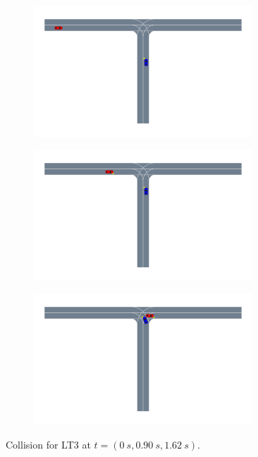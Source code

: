 \begin{figure}
\vskip -0.2in
    \centering
    \begin{subfigure}[t]{0.33\columnwidth}
        \centering
        \includegraphics[width=0.9\textwidth, trim={8cm 16cm 22cm 0},clip]{figures/interpretable_validation/2car_res3_frame_01.pdf}
    \end{subfigure}%
   \begin{subfigure}[t]{0.33\columnwidth}
        \centering
        \includegraphics[width=0.9\textwidth, trim={10cm 16.5cm 22cm 0},clip]{figures/interpretable_validation/2car_res3_frame_06.pdf}
    \end{subfigure}%
    \begin{subfigure}[t]{0.33\columnwidth}
        \centering
        \includegraphics[width=0.9\textwidth, trim={10cm 16.5cm 22cm 0},clip]{figures/interpretable_validation/2car_res3_frame_10.pdf}
    \end{subfigure}
    \caption{Collision for LT3 at $t=(\SI{0}{s}, \SI{0.90}{s}, \SI{1.62}{s})$.}
    \label{fig:2car_LT3}
\end{figure}

